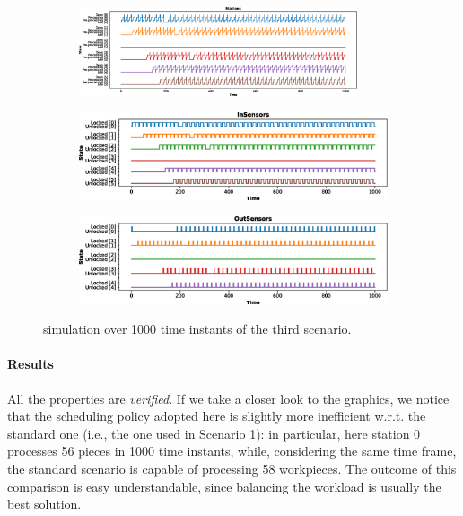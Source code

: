 \documentclass[a4paper]{article}
\begin{document}
    \begin{figure}[h!]
        \begin{subfigure}{\textwidth}
            \centering
            \includegraphics[width=0.9\textwidth]{images/scenarios/scenario3_stations}
        \end{subfigure}
        \begin{subfigure}{0.49\textwidth}
            \centering
            \includegraphics[width=\textwidth]{images/scenarios/scenario3_insensors}
        \end{subfigure}
        \hfill
        \begin{subfigure}{0.49\textwidth}
            \centering
            \includegraphics[width=\textwidth]{images/scenarios/scenario3_outsensors}
        \end{subfigure}
        \caption{simulation over 1000 time instants of the third scenario.}
        \label{figure:scenario:3}
    \end{figure}

    \paragraph{Results} All the properties are \textit{verified}. If we take a closer look to the graphics, we notice that the scheduling policy adopted here is slightly more inefficient w.r.t. the standard one (i.e., the one used in Scenario 1): in particular, here station 0 processes 56 pieces in 1000 time instants, while, considering the same time frame, the standard scenario is capable of processing 58 workpieces. The outcome of this comparison is easy understandable, since balancing the workload is usually the best solution.
\end{document}
